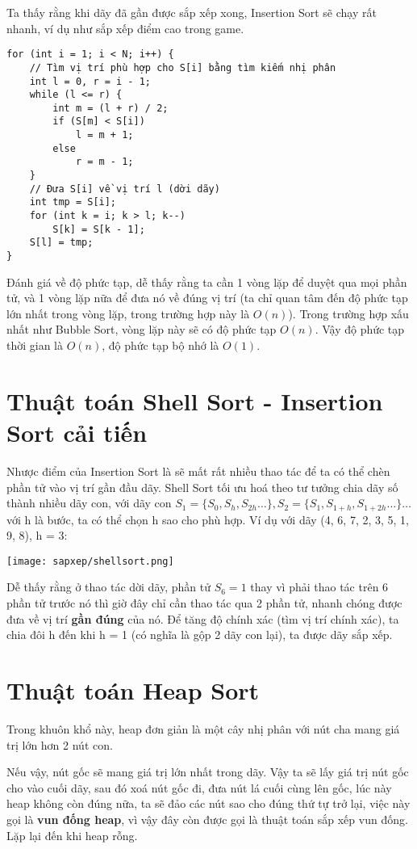 Ta thấy rằng khi dãy đã gần được sắp xếp xong, Insertion Sort sẽ chạy rất nhanh, ví dụ như sắp xếp điểm cao trong game.

\begin{verbatim}
for (int i = 1; i < N; i++) {
    // Tìm vị trí phù hợp cho S[i] bằng tìm kiếm nhị phân
    int l = 0, r = i - 1;
    while (l <= r) {
        int m = (l + r) / 2;
        if (S[m] < S[i])
            l = m + 1;
        else
            r = m - 1;
    }
    // Đưa S[i] về vị trí l (dời dãy)
    int tmp = S[i];
    for (int k = i; k > l; k--)
        S[k] = S[k - 1];
    S[l] = tmp;
}
\end{verbatim}

Đánh giá về độ phức tạp, dễ thấy rằng ta cần 1 vòng lặp để duyệt qua mọi phần tử, và 1 vòng lặp nữa để đưa nó về đúng vị trí (ta chỉ quan tâm đến độ phức tạp lớn nhất trong vòng lặp, trong trường hợp này là $O(n)$). Trong trường hợp xấu nhất như Bubble Sort, vòng lặp này sẽ có độ phức tạp $O(n)$. Vậy độ phức tạp thời gian là $O(n)$, độ phức tạp bộ nhớ là $O(1)$.

\section{Thuật toán Shell Sort - Insertion Sort cải tiến}
Nhược điểm của Insertion Sort là sẽ mất rất nhiều thao tác để ta có thể chèn phần tử vào vị trí gần đầu dãy. Shell Sort tối ưu hoá theo tư tưởng chia dãy số thành nhiều dãy con, với dãy con $S_1=\{S_0,S_{h},S_{2h}\dots\},S_2=\{S_1,S_{1+h},S_{1+2h}\dots\}\dots$ với h là bước, ta có thể chọn h sao cho phù hợp. Ví dụ với dãy (4, 6, 7, 2, 3, 5, 1, 9, 8), h = 3:

\texttt{[image: sapxep/shellsort.png]}

Dễ thấy rằng ở thao tác dời dãy, phần tử $S_6=1$ thay vì phải thao tác trên 6 phần tử trước nó thì giờ đây chỉ cần thao tác qua 2 phần tử, nhanh chóng được đưa về vị trí \textbf{gần đúng} của nó. Để tăng độ chính xác (tìm vị trí chính xác), ta chia đôi h đến khi h = 1 (có nghĩa là gộp 2 dãy con lại), ta được dãy sắp xếp.

\section{Thuật toán Heap Sort}
Trong khuôn khổ này, heap đơn giản là một cây nhị phân với nút cha mang giá trị lớn hơn 2 nút con.

Nếu vậy, nút gốc sẽ mang giá trị lớn nhất trong dãy. Vậy ta sẽ lấy giá trị nút gốc cho vào cuối dãy, sau đó xoá nút gốc đi, đưa nút lá cuối cùng lên gốc, lúc này heap không còn đúng nữa, ta sẽ đảo các nút sao cho đúng thứ tự trở lại, việc này gọi là \textbf{vun đống heap}, vì vậy đây còn được gọi là thuật toán sắp xếp vun đống. Lặp lại đến khi heap rỗng.

